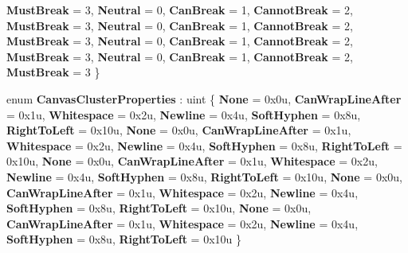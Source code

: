 \begin{DoxyCompactItemize}
{\bfseries Must\+Break} = 3, 
\newline
{\bfseries Neutral} = 0, 
{\bfseries Can\+Break} = 1, 
{\bfseries Cannot\+Break} = 2, 
{\bfseries Must\+Break} = 3, 
\newline
{\bfseries Neutral} = 0, 
{\bfseries Can\+Break} = 1, 
{\bfseries Cannot\+Break} = 2, 
{\bfseries Must\+Break} = 3, 
\newline
{\bfseries Neutral} = 0, 
{\bfseries Can\+Break} = 1, 
{\bfseries Cannot\+Break} = 2, 
{\bfseries Must\+Break} = 3, 
\newline
{\bfseries Neutral} = 0, 
{\bfseries Can\+Break} = 1, 
{\bfseries Cannot\+Break} = 2, 
{\bfseries Must\+Break} = 3
 \}
\item 
\mbox{\label{namespace_microsoft_1_1_graphics_1_1_canvas_1_1_text_ad08119da3ea5d8ada9d9d9166a9516e7}} 
enum {\bfseries Canvas\+Cluster\+Properties} \+: uint \{ \newline
{\bfseries None} = 0x0u, 
{\bfseries Can\+Wrap\+Line\+After} = 0x1u, 
{\bfseries Whitespace} = 0x2u, 
{\bfseries Newline} = 0x4u, 
\newline
{\bfseries Soft\+Hyphen} = 0x8u, 
{\bfseries Right\+To\+Left} = 0x10u, 
{\bfseries None} = 0x0u, 
{\bfseries Can\+Wrap\+Line\+After} = 0x1u, 
\newline
{\bfseries Whitespace} = 0x2u, 
{\bfseries Newline} = 0x4u, 
{\bfseries Soft\+Hyphen} = 0x8u, 
{\bfseries Right\+To\+Left} = 0x10u, 
\newline
{\bfseries None} = 0x0u, 
{\bfseries Can\+Wrap\+Line\+After} = 0x1u, 
{\bfseries Whitespace} = 0x2u, 
{\bfseries Newline} = 0x4u, 
\newline
{\bfseries Soft\+Hyphen} = 0x8u, 
{\bfseries Right\+To\+Left} = 0x10u, 
{\bfseries None} = 0x0u, 
{\bfseries Can\+Wrap\+Line\+After} = 0x1u, 
\newline
{\bfseries Whitespace} = 0x2u, 
{\bfseries Newline} = 0x4u, 
{\bfseries Soft\+Hyphen} = 0x8u, 
{\bfseries Right\+To\+Left} = 0x10u, 
\newline
{\bfseries None} = 0x0u, 
{\bfseries Can\+Wrap\+Line\+After} = 0x1u, 
{\bfseries Whitespace} = 0x2u, 
{\bfseries Newline} = 0x4u, 
\newline
{\bfseries Soft\+Hyphen} = 0x8u, 
{\bfseries Right\+To\+Left} = 0x10u
 \}
\item 
\mbox{\label{namespace_microsoft_1_1_graphics_1_1_canvas_1_1_text_ac5d7a4bab634cb1b3f6a231971b80974}} 

\end{DoxyCompactItemize}
